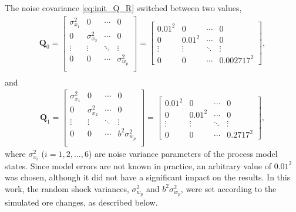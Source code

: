 The noise covariance \eqref{eq:init_Q_R} switched between two values,
\begin{equation} \label{eq:Q0}
	\begin{aligned}
		\mathbf{Q}_0=\begin{bmatrix}
			\sigma_{x_1}^2 & 0 & \cdots & 0 \\
			0 & \sigma_{x_2}^2 & \cdots & 0 \\
			\vdots & \vdots & \ddots & \vdots \\
			0 & 0 & \cdots & \sigma_{w_p}^2 \\
		\end{bmatrix}=\begin{bmatrix}
			0.01^2 & 0 & \cdots & 0 \\
			0 & 0.01^2 & \cdots & 0 \\
			\vdots & \vdots & \ddots & \vdots \\
			0 & 0 & \cdots & 0.002717^2
		\end{bmatrix}, \\
	\end{aligned}
\end{equation}
and 
\begin{equation} \label{eq:Q1}
	\begin{aligned}
		\mathbf{Q}_1=\begin{bmatrix}
			\sigma_{x_1}^2 & 0 & \cdots & 0 \\
			0 & \sigma_{x_2}^2 & \cdots & 0 \\
			\vdots & \vdots & \ddots & \vdots \\
			0 & 0 & \cdots & b^2\sigma_{w_p}^2 \\
		\end{bmatrix}=\begin{bmatrix}
			0.01^2 & 0 & \cdots & 0 \\
			0 & 0.01^2 & \cdots & 0 \\
			\vdots & \vdots & \ddots & \vdots \\
			0 & 0 & \cdots & 0.2717^2
		\end{bmatrix},
	\end{aligned}
\end{equation}
where $\sigma_{x_i}^2$ ($i=1,2,...,6$) are noise variance parameters of the process model states. Since model errors are not known in practice, an arbitrary value of $0.01^2$ was chosen, although it did not have a significant impact on the results. In this work, the random shock variances, $\sigma_{w_p}^2$ and $b^2\sigma_{w_p}^2$, were set according to the simulated ore changes, as described below.


